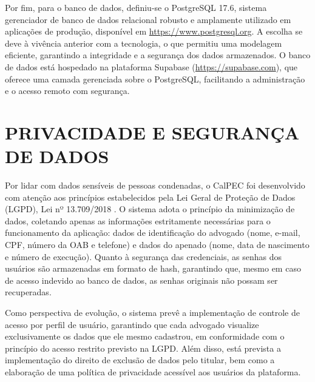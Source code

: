 Por fim, para o banco de dados, definiu-se o PostgreSQL 
17.6\cite{postgresql}, sistema gerenciador de banco de dados relacional robusto e amplamente utilizado em aplicações de produção, disponível em \url{https://www.postgresql.org}. A escolha se deve à vivência anterior com a tecnologia, o que permitiu uma modelagem eficiente, garantindo a integridade e a segurança dos dados armazenados. O banco de dados está hospedado na plataforma Supabase\cite{supabase} 
(\url{https://supabase.com}), que oferece uma camada gerenciada sobre o PostgreSQL, facilitando a administração e o acesso remoto com segurança.

\section{PRIVACIDADE E SEGURANÇA DE DADOS}

Por lidar com dados sensíveis de pessoas condenadas, o CalPEC foi desenvolvido com atenção aos princípios estabelecidos pela Lei Geral de Proteção de Dados (LGPD), Lei nº 13.709/2018 \cite{lgpd}. O sistema adota o princípio da minimização de dados, coletando apenas as informações estritamente necessárias para o funcionamento da aplicação: dados de identificação do advogado (nome, e-mail, CPF, número da OAB e telefone) e dados do apenado (nome, data de nascimento e número de execução). Quanto à segurança das credenciais, as senhas dos usuários são armazenadas em formato de hash, garantindo que, mesmo em caso de acesso indevido ao banco de dados, as senhas originais não possam ser recuperadas.

Como perspectiva de evolução, o sistema prevê a implementação de controle de acesso por perfil de usuário, garantindo que cada advogado visualize exclusivamente os dados que ele mesmo cadastrou, em conformidade com o princípio do acesso restrito previsto na LGPD. Além disso, está prevista a implementação do direito de exclusão de dados pelo titular, bem como a elaboração de uma política de privacidade acessível aos usuários da plataforma.